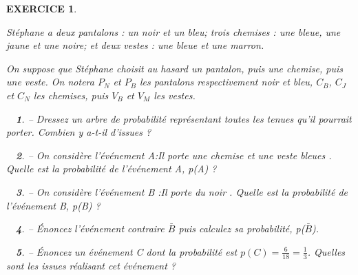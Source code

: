 \documentclass[a4paper]{article}   %
\renewcommand{\(}{\left(}
\renewcommand{\)}{\right)}
\newtheorem{ques}{~}
\newenvironment{qu}{\begin{ques}--} {\end{ques}}
\newtheorem{EXO}{\large EXERCICE }
\newenvironment{EX}   { \setcounter{ques}{0} \begin{EXO} \hrulefill ~\vspace{0.3cm}

\normalfont}    {\end{EXO} \medskip}
\begin{document}
\begin{EX}
Stéphane a deux pantalons : un noir et un bleu; trois chemises : une bleue, une jaune et une noire; et deux vestes : une bleue et une marron.

On suppose que Stéphane choisit au hasard un pantalon, puis une chemise, puis une veste. On notera $P_N$ et $P_B$ les pantalons respectivement noir et bleu, $C_B$, $C_J$ et $C_N$ les chemises, puis $V_B$ et $V_M$ les vestes. 
\begin{qu} Dressez un arbre de probabilité représentant toutes les tenues qu'il pourrait porter. Combien y a-t-il d'issues ?
\end{qu}

\begin{qu} On considère l'événement A:\og Il porte une chemise et une veste bleues \fg. Quelle est la probabilité de l'événement A, p(A) ?
\end{qu}

\begin{qu} On considère l'événement B :\og Il porte du noir \fg. Quelle est la probabilité de l'événement B, p(B) ?
\end{qu}

\begin{qu} \'Enoncez l'événement contraire $\bar B$ puis calculez sa probabilité, p($\bar B$).
\end{qu}

\begin{qu} \'Enoncez un événement C dont la probabilité est $p(C)=\displaystyle{ \frac{6}{18}=\frac{1}{3}}$. Quelles sont les issues réalisant cet événement ?
\end{qu}

\end{EX}
\end{document}
